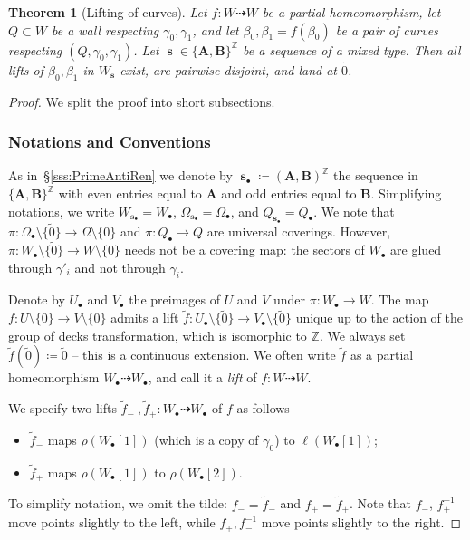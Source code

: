 \documentclass[]{amsart}
\newcommand\seq{{\operatorname{\mathbf s}}}
\newcommand\seqo{{\operatorname{\mathbf s}_{\bullet}}}
\newcommand\oseq{{\bullet}}
\newcommand{\A}{\mathbf A}
\newcommand{\B}{\mathbf B}
\newcommand\wzero{{\widetilde 0}}
\newcommand\wall{{Q}}
\newcommand\inn{{\Omega}}
\newcommand{\Z}{\mathbb{Z}}
\newtheorem{thm}{Theorem}[section]
\theoremstyle{remark}
\numberwithin{equation}{section}
\theoremstyle{definition}
\begin{document}
\begin{thm}[Lifting of curves]
\label{thm:AntiRen:Lifts}
Let $f\colon W\dashrightarrow W$ be a partial homeomorphism, let $\wall\subset W$ be a wall respecting $\gamma_0,\gamma_1$, and let $\beta_0, \beta_1=f(\beta_0)$ be a pair of curves respecting $(\wall,\gamma_0,\gamma_1)$.  Let $\seq \in \{\A,\B\}^{\Z}$ be a sequence of a mixed type. Then all lifts of $\beta_0,\beta_1$ in $W_\seq$ exist, are pairwise disjoint, and land at $\wzero$.
\end{thm}
\begin{proof}


We split the proof into short subsections.

\subsubsection{Notations and Conventions}
As in~\S\ref{sss:PrimeAntiRen} we denote by $\seqo\coloneqq (\A,\B)^{\Z}$ the sequence in $\{\A,\B\}^{\Z}$ with even entries equal to $\A$ and odd entries equal to $\B$. Simplifying notations, we write $W_{\seqo}=W_{\oseq}$, $\inn_{\seqo}=\inn_{\oseq}$, and $\wall_{\seqo}=\wall_{\oseq}$. We note that $\pi\colon \inn_{\oseq }\setminus \{\widetilde 0\} \to \inn\setminus \{0\}$ and  $\pi\colon \wall_{\oseq }\to \wall$ are universal coverings. However, $\pi \colon W_{\oseq }\setminus \{\widetilde 0\} \to W\setminus \{0\}$ needs not be a covering map: the sectors of $W_{\oseq }$ are glued through $\gamma'_i$ and not through $\gamma_i$. 


Denote by $U_{\oseq }$ and $V_{\oseq }$ the preimages of $U$ and $V$ under $\pi\colon W_{\oseq}\to W$. The map $f\colon U\setminus \{0\} \to V\setminus\{0\}$ admits a lift $\widetilde f\colon U_{\oseq }\setminus\{\widetilde 0\} \to V_{\oseq } \setminus\{\widetilde 0\}$ unique up to the action of the group of decks transformation, which is isomorphic to $\Z$. 
We always set $\widetilde f(\widetilde 0)\coloneqq \widetilde 0$ -- this is a continuous extension. We often write $\widetilde f$ as a partial homeomorphism $ W_{\oseq }\dashrightarrow W_{\oseq }$, and call it a \emph{lift} of $f\colon W\dashrightarrow W$.  

We specify two lifts  $\widetilde f_-~,\widetilde f_+\colon W_{\oseq }\dashrightarrow W_{\oseq }$ of $f$ as follows
\begin{itemize}
\item $\widetilde f_-$ maps $\rho(W_{\oseq }[1])$ (which is a copy of $\gamma_0$) to $\ell(W_{\oseq }[1])$; 
\item $\widetilde f_+$ maps $\rho(W_{\oseq }[1])$ to $\rho(W_{\oseq }[2])$. 
\end{itemize}
To simplify notation, we omit the tilde: $f_-=\widetilde f_-$ and $f_+=\widetilde f_+$. Note that $f_-$, $f_+^{-1}$ move points slightly to the left, while $f_+, f_-^{-1}$ move points slightly to the right. 



\end{proof}
\end{document}
